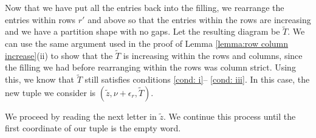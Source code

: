 \documentclass[ALCO, Unicode]{cedram}
\begin{document}
\begin{alg}
    
Now that we have put all the entries back into the filling, we rearrange the entries within rows $r'$ and above so that the entries within the rows are increasing and we have a partition shape with no gaps.
Let the resulting diagram be $\tilde{T}$. We can use the same argument used in the proof of Lemma \ref{lemma:row column increase}(ii) to show that the $\tilde{T}$ is increasing within the rows and columns, since the filling we had before rearranging within the rows was column strict. Using this, we know that $\tilde{T}$ still satisfies conditions \ref{cond: i}-- \ref{cond: iii}.
In this case, the new tuple we consider is $(\tilde{z},\nu+\epsilon_{r}, \tilde{T})$.

We proceed by reading the next letter in $\tilde{z}$. We continue this process until the first coordinate of our tuple is the empty word.
    \end{alg}
\end{document}
